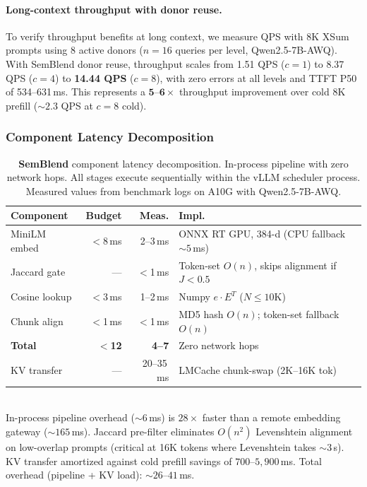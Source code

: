\documentclass[10pt,twocolumn]{article}
\begin{document}
\paragraph{Long-context throughput with donor reuse.}
To verify throughput benefits at long context, we measure QPS with
8K XSum prompts using 8 active donors ($n{=}16$ queries per level,
Qwen2.5-7B-AWQ). With SemBlend donor reuse, throughput scales from
1.51 QPS ($c{=}1$) to 8.37 QPS ($c{=}4$) to \textbf{14.44 QPS} ($c{=}8$),
with zero errors at all levels and TTFT P50 of 534--631\,ms. This
represents a $\mathbf{5}$--$\mathbf{6}\times$ throughput improvement over
cold 8K prefill (${\sim}2.3$ QPS at $c{=}8$ cold).

\subsubsection{Component Latency Decomposition}
\label{sec:local-breakdown}

\begin{table}[t]
\centering
\caption{\textbf{SemBlend} component latency decomposition.
In-process pipeline with zero network hops. All stages execute
sequentially within the vLLM scheduler process. Measured values
from benchmark logs on A10G with Qwen2.5-7B-AWQ.}
\label{tab:component-breakdown}
\scriptsize
\setlength{\tabcolsep}{2.5pt}
\begin{tabular}{@{}lrrl@{}}
\toprule
\textbf{Component} & \textbf{Budget} & \textbf{Meas.} & \textbf{Impl.} \\
\midrule
MiniLM embed  & $<$8\,ms & 2--3\,ms & ONNX RT GPU, 384-d (CPU fallback ${\sim}5$\,ms) \\
Jaccard gate  & ---      & $<$1\,ms & Token-set $O(n)$, skips alignment if $J{<}0.5$ \\
Cosine lookup & $<$3\,ms & 1--2\,ms & Numpy $e\!\cdot\!E^T$ ($N{\leq}10$K) \\
Chunk align   & $<$1\,ms & $<$1\,ms & MD5 hash $O(n)$; token-set fallback $O(n)$ \\
\midrule
\textbf{Total}    & $<$\textbf{12} & \textbf{4--7} & Zero network hops \\
\midrule
KV transfer   & --- & 20--35\,ms & LMCache chunk-swap (2K--16K tok) \\
\bottomrule
\end{tabular}\\[2pt]
{\scriptsize In-process pipeline overhead (${\sim}6$\,ms) is $28\times$ faster than a remote
embedding gateway (${\sim}165$\,ms). Jaccard pre-filter eliminates $O(n^2)$ Levenshtein alignment
on low-overlap prompts (critical at 16K tokens where Levenshtein takes ${\sim}3$\,s).
KV transfer amortized against cold prefill savings of $700$--$5{,}900$\,ms.
Total overhead (pipeline + KV load): ${\sim}26$--$41$\,ms.}
\end{table}
\end{document}
